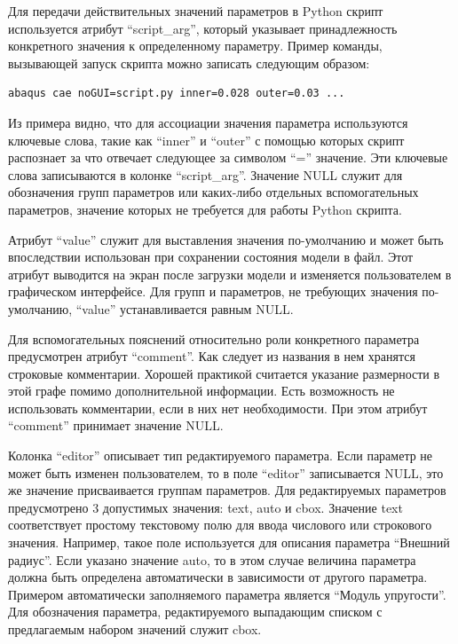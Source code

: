 \documentclass[14pt,oneside,final]{extreport}
\begin{document}
	Для передачи действительных значений параметров в Python скрипт используется атрибут ``script\_arg'', который указывает принадлежность конкретного значения к определенному параметру. Пример команды, вызывающей запуск скрипта можно записать следующим образом: \begin{verbatim}abaqus cae noGUI=script.py inner=0.028 outer=0.03 ... \end{verbatim}	
	Из примера видно, что для ассоциации значения параметра используются ключевые слова, такие как ``inner'' и ``outer'' с помощью которых скрипт распознает за что отвечает следующее за символом ``='' значение. Эти ключевые слова записываются в колонке  ``script\_arg''. Значение NULL служит для обозначения групп параметров или каких-либо отдельных вспомогательных параметров, значение которых не требуется для работы Python скрипта.

	Атрибут ``value'' служит для выставления значения по-умолчанию и может быть впоследствии использован при сохранении состояния модели в файл. Этот атрибут выводится на экран после загрузки модели и изменяется пользователем в графическом интерфейсе. Для групп и параметров, не требующих значения по-умолчанию, ``value'' устанавливается равным NULL. 

	Для вспомогательных пояснений относительно роли конкретного параметра предусмотрен атрибут ``comment''. Как следует из названия в нем хранятся строковые комментарии. Хорошей практикой считается указание размерности в этой графе помимо дополнительной информации. Есть возможность не использовать комментарии, если в них нет необходимости. При этом атрибут  ``comment'' принимает значение NULL. 
	
	Колонка ``editor'' описывает тип редактируемого параметра. Если параметр не может быть изменен пользователем, то в поле ``editor'' записывается NULL, это же значение присваивается группам параметров. Для редактируемых параметров предусмотрено 3 допустимых значения: text, auto и cbox. Значение text соответствует простому текстовому полю для ввода числового или строкового значения. Например, такое поле используется для описания параметра ``Внешний радиус''. Если указано значение auto, то в этом случае величина параметра должна быть определена автоматически в зависимости от другого параметра. Примером автоматически заполняемого параметра является ``Модуль упругости''. Для обозначения параметра, редактируемого выпадающим списком с предлагаемым набором значений служит cbox.
\end{document}
